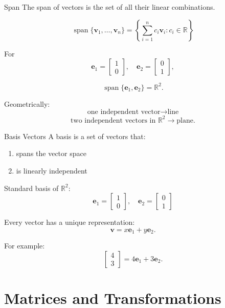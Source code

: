 \documentclass[aspectratio=169]{beamer}
\begin{document}
\begin{frame}{Span}
The span of vectors is the set of all their linear combinations.

\[
\operatorname{span}\{\mathbf v_1,\ldots,\mathbf v_n\}
=
\left\{
\sum_{i=1}^{n}c_i\mathbf v_i:c_i\in\mathbb R
\right\}
\]

For
\[
\mathbf e_1=\begin{bmatrix}1\\0\end{bmatrix},
\quad
\mathbf e_2=\begin{bmatrix}0\\1\end{bmatrix},
\]

\[
\operatorname{span}\{\mathbf e_1,\mathbf e_2\}
=\mathbb R^2.
\]

Geometrically:
\[
\text{one independent vector}\rightarrow\text{line}
\]
\[
\text{two independent vectors in }\mathbb R^2\rightarrow\text{plane}.
\]
\end{frame}

\begin{frame}{Basis Vectors}
A basis is a set of vectors that:

\begin{enumerate}
\item spans the vector space
\item is linearly independent
\end{enumerate}

Standard basis of $\mathbb R^2$:
\[
\mathbf e_1=\begin{bmatrix}1\\0\end{bmatrix},
\quad
\mathbf e_2=\begin{bmatrix}0\\1\end{bmatrix}
\]

Every vector has a unique representation:
\[
\mathbf v=x\mathbf e_1+y\mathbf e_2.
\]

For example:
\[
\begin{bmatrix}4\\3\end{bmatrix}
=
4\mathbf e_1+3\mathbf e_2.
\]
\end{frame}

\section{Matrices and Transformations}
\end{document}
